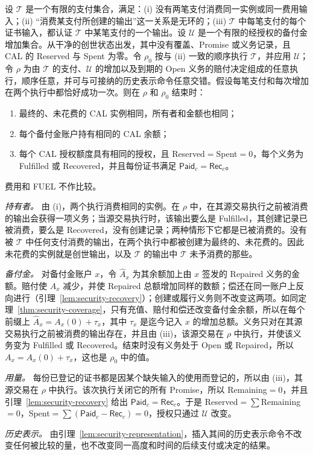 \begin{theorem}[延迟中性]
\label{thm:security-neutrality}
设 $\mathcal T$ 是一个有限的支付集合，满足：(i) 没有两笔支付消费同一实例或同一费用输入；(ii) “消费某支付所创建的输出”这一关系是无环的；(iii) $\mathcal T$ 中每笔支付的每个证书输入，都认证 $\mathcal T$ 中某笔支付的一个输出。设 $\mathcal U$ 是一个有限的经授权的备付金增加集合。从干净的创世状态出发，其中没有覆盖、Promise 或义务记录，且 CAL 的 Reserved 与 Spent 为零。令 $\rho_0$ 按与 (ii) 一致的顺序执行 $\mathcal T$，并应用 $\mathcal U$；令 $\rho$ 为由 $\mathcal T$ 的支付、$\mathcal U$ 的增加以及到期的 Open 义务的赔付决定组成的任意执行，顺序任意，并可与可接纳的历史表示命令任意交错。假设每笔支付和每次增加在两个执行中都恰好成功一次。则在 $\rho$ 和 $\rho_0$ 结束时：
\begin{enumerate}
\item 最终的、未花费的 CAL 实例相同，所有者和金额也相同；
\item 每个备付金账户持有相同的 CAL 余额；
\item 每个 CAL 授权额度具有相同的授权，且
Reserved$=$Spent$=0$，每个义务为 Fulfilled 或 Recovered，并且每份证书满足
$\mathsf{Paid}_c=\mathsf{Rec}_c$。
\end{enumerate}
费用和 FUEL 不作比较。
\end{theorem}
\begin{IEEEproof}
\emph{持有者。} 由 (i)，两个执行消费相同的实例。在 $\rho$ 中，在其源交易执行之前被消费的输出会获得一项义务；当源交易执行时，该输出要么是 Fulfilled，其创建记录已被消费，要么是 Recovered，没有创建记录；两种情形下它都是已被消费的。没有被 $\mathcal T$ 中任何支付消费的输出，在两个执行中都被创建为最终的、未花费的。因此未花费的实例就是创世输出，以及 $\mathcal T$ 的输出中 $\mathcal T$ 未予消费的那些。

\emph{备付金。} 对备付金账户 $x$，令 $\hat A_x$ 为其余额加上由 $x$ 签发的 Repaired 义务的金额。赔付使 $A_x$ 减少，并使 Repaired 总额增加同样的数额；偿还在同一账户上反向进行（引理~\ref{lem:security-recovery}）；创建或履行义务则不改变这两项。如同定理~\ref{thm:security-coverage}，只有充值、赔付和偿还改变备付金余额，所以在每个前缀上 $\hat A_x=A_x(0)+\tau_x$，其中 $\tau_x$ 是迄今记入 $x$ 的增加总额。义务只对在其源交易执行之前被消费的输出存在，并且由 (iii)，该源交易在 $\rho$ 中执行，并使该义务变为 Fulfilled 或 Recovered。结束时没有义务处于 Open 或 Repaired，所以 $A_x=A_x(0)+\tau_x$，这也是 $\rho_0$ 中的值。

\emph{用量。} 每份已登记的证书都是因某个缺失输入的使用而登记的，所以由 (iii)，其源交易在 $\rho$ 中执行。该次执行关闭它的所有 Promise，所以 Remaining$=0$，并且引理~\ref{lem:security-recovery} 给出 $\mathsf{Paid}_c=\mathsf{Rec}_c$。于是 Reserved$=\sum$Remaining$=0$，Spent$=\sum(\mathsf{Paid}_c-\mathsf{Rec}_c)=0$，授权只通过 $\mathcal U$ 改变。

\emph{历史表示。} 由引理~\ref{lem:security-representation}，插入其间的历史表示命令不改变任何被比较的量，也不改变同一高度和时间的后续支付或决定的结果。
\end{IEEEproof}

